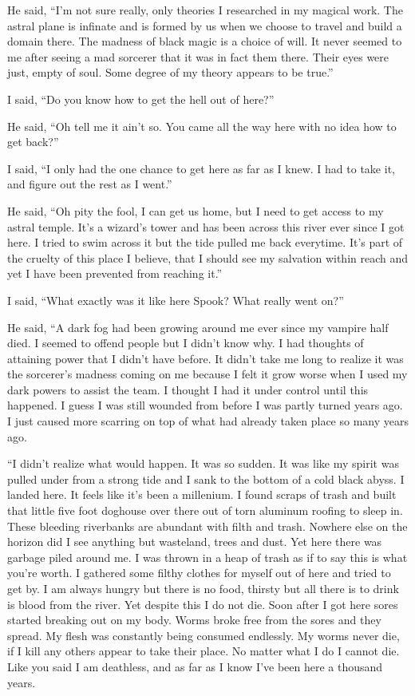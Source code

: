 He said, ``I'm not sure really, only theories I researched in my magical work. The astral plane is infinate and is formed by us when we choose to travel and build a domain there. The madness of black magic is a choice of will. It never seemed to me after seeing a mad sorcerer that it was in fact them there. Their eyes were just, empty of soul. Some degree of my theory appears to be true.''

I said, ``Do you know how to get the hell out of here?''

He said, ``Oh tell me it ain't so. You came all the way here with no idea how to get back?''

I said, ``I only had the one chance to get here as far as I knew. I had to take it, and figure out the rest as I went.''

He said, ``Oh pity the fool, I can get us home, but I need to get access to my astral temple. It's a wizard's tower and has been across this river ever since I got here. I tried to swim across it but the tide pulled me back everytime. It's part of the cruelty of this place I believe, that I should see my salvation within reach and yet I have been prevented from reaching it.''

I said, ``What exactly was it like here Spook? What really went on?''

He said, ``A dark fog had been growing around me ever since my vampire half died. I seemed to offend people but I didn't know why. I had thoughts of attaining power that I didn't have before. It didn't take me long to realize it was the sorcerer's madness coming on me because I felt it grow worse when I used my dark powers to assist the team. I thought I had it under control until this happened. I guess I was still wounded from before I was partly turned years ago. I just caused more scarring on top of what had already taken place so many years ago.

``I didn't realize what would happen. It was so sudden. It was like my spirit was pulled under from a strong tide and I sank to the bottom of a cold black abyss. I landed here. It feels like it's been a millenium. I found scraps of trash and built that little five foot doghouse over there out of torn aluminum roofing to sleep in. These bleeding riverbanks are abundant with filth and trash. Nowhere else on the horizon did I see anything but wasteland, trees and dust. Yet here there was garbage piled around me. I was thrown in a heap of trash as if to say this is what you're worth. I gathered some filthy clothes for myself out of here and tried to get by. I am always hungry but there is no food, thirsty but all there is to drink is blood from the river. Yet despite this I do not die. Soon after I got here sores started breaking out on my body. Worms broke free from the sores and they spread. My flesh was constantly being consumed endlessly. My worms never die, if I kill any others appear to take their place. No matter what I do I cannot die. Like you said I am deathless, and as far as I know I've been here a thousand years.

